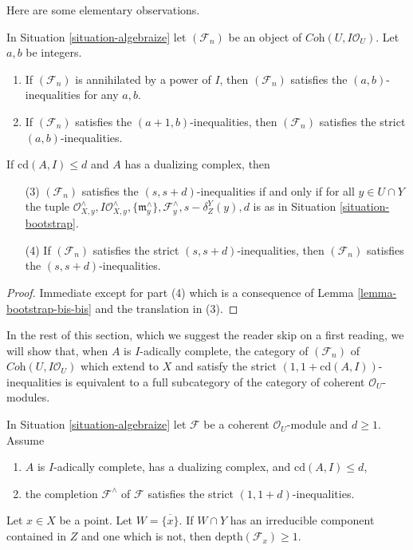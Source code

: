 \noindent
Here are some elementary observations.

\begin{lemma}
\label{lemma-elementary}
In Situation \ref{situation-algebraize} let $(\mathcal{F}_n)$ be an object
of $\textit{Coh}(U, I\mathcal{O}_U)$. Let $a, b$ be integers.
\begin{enumerate}
\item If $(\mathcal{F}_n)$ is annihilated by a power of $I$, then
$(\mathcal{F}_n)$ satisfies the $(a, b)$-inequalities for any $a, b$.
\item If $(\mathcal{F}_n)$ satisfies the $(a + 1, b)$-inequalities, then
$(\mathcal{F}_n)$ satisfies the strict $(a, b)$-inequalities.
\end{enumerate}
If $\text{cd}(A, I) \leq d$ and $A$ has a dualizing complex, then
\begin{enumerate}
\item[(3)] $(\mathcal{F}_n)$ satisfies the $(s, s + d)$-inequalities
if and only if for all $y \in U \cap Y$ the tuple
$\mathcal{O}_{X, y}^\wedge, I\mathcal{O}_{X, y}^\wedge,
\{\mathfrak m_y^\wedge\}, \mathcal{F}_y^\wedge, s - \delta^Y_Z(y), d$
is as in Situation \ref{situation-bootstrap}.
\item[(4)]
If $(\mathcal{F}_n)$ satisfies the strict $(s, s + d)$-inequalities, then
$(\mathcal{F}_n)$ satisfies the $(s, s + d)$-inequalities.
\end{enumerate}
\end{lemma}

\begin{proof}
Immediate except for part (4) which is a consequence of
Lemma \ref{lemma-bootstrap-bis-bis} and the translation in (3).
\end{proof}

\noindent
In the rest of this section, which we suggest the reader skip on a first
reading, we will show that, when $A$ is $I$-adically complete,
the category of $(\mathcal{F}_n)$ of $\textit{Coh}(U, I\mathcal{O}_U)$
which extend to $X$ and satisfy the
strict $(1, 1 + \text{cd}(A, I))$-inequalities
is equivalent to a full subcategory of the category of coherent
$\mathcal{O}_U$-modules.

\begin{lemma}
\label{lemma-sanity}
In Situation \ref{situation-algebraize} let $\mathcal{F}$ be a
coherent $\mathcal{O}_U$-module and $d \geq 1$. Assume
\begin{enumerate}
\item $A$ is $I$-adically complete, has a dualizing complex, and
$\text{cd}(A, I) \leq d$,
\item the completion $\mathcal{F}^\wedge$ of $\mathcal{F}$
satisfies the strict $(1, 1 + d)$-inequalities.
\end{enumerate}
Let $x \in X$ be a point. Let $W = \overline{\{x\}}$.
If $W \cap Y$ has an irreducible component contained in $Z$
and one which is not, then $\text{depth}(\mathcal{F}_x) \geq 1$.
\end{lemma}

